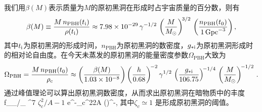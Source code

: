 我们用$\beta( M )$表示质量为$M$的原初黑洞在形成时占宇宙质量的百分数，则有\cite{Carr:2009jm}
\begin{equation}
    \beta( M )
    \equiv
    \frac{M\,n_{\mathrm{PBH}}(t_{\mathrm{i}})}{\rho(t_{\mathrm{i}})}
    \approx
    7.98 \times 10^{-29}\,
    \gamma^{-1/2}\,
    \left( \frac{M}{M_{\odot}} \right)^{\!3/2}\,
    \left( \frac{n_{\mathrm{PBH}}(t_{0})}{1\,\mathrm{Gpc}^{-3}} \right)
    ,
    \label{eq:beta}
\end{equation}
其中$t_{\mathrm{i}}$为原初黑洞的形成时间，$n_{\mathrm{PBH}}$为原初黑洞的数密度，$g_{* \mathrm{i}}$为原初黑洞形成时的相对论自由度。在今天未蒸发的原初黑洞的能量密度参数$\Omega_{\mathrm{PBH}}$大致为\cite{Carr:1975qj}
\begin{equation}
    \Omega_{\mathrm{PBH}}
    =
    \frac{M\,n_{\mathrm{PBH}}( t_{0} )}{\rho_{\mathrm{c}}}
    \approx
    \left( \frac{\beta( M )}{1.03 \times 10^{-8}} \right)
    \left( \frac{h}{0.68} \right)^{\!-2}
    \gamma^{1/2}\,
    \left( \frac{g_{* \mathrm{i}}}{106.75} \right)^{\!-1/4}\,
    \left( \frac{M}{M_{\odot}} \right)^{\!-1/2}
    \,.
    \label{eq:omega}
\end{equation}
通过峰值理论可以算出原初黑洞数密度，从而求出原初黑洞在暗物质中的丰度\cite{Carr:2016drx}
\m\label{fpbh}
f_{}\equiv\Omega_{}/\Omega_{}  ^{7}
\({\zeta_c^2/A}-1\) e^{-{\zeta_c^2\over 2A}} \left(\right)^{-},
\n
其中$\zeta_{c}\simeq1$ \cite{Musco:2008hv,Musco:2004ak,Musco:2012au,Harada:2013epa,Escriva:2019nsa,Escriva:2019phb}是形成原初黑洞的阈值。


